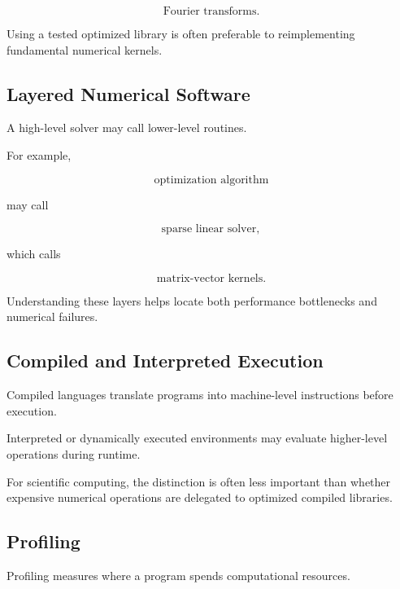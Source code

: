 \[
\boxed{
\text{Fourier transforms}.
}
\]

Using a tested optimized library is often preferable to reimplementing
fundamental numerical kernels.

\subsection{Layered Numerical Software}
\label{subsec:layered-numerical-software}

A high-level solver may call lower-level routines.

For example,

\[
\boxed{
\text{optimization algorithm}
}
\]

may call

\[
\boxed{
\text{sparse linear solver},
}
\]

which calls

\[
\boxed{
\text{matrix-vector kernels}.
}
\]

Understanding these layers helps locate both performance bottlenecks and
numerical failures.

\subsection{Compiled and Interpreted Execution}
\label{subsec:compiled-interpreted}

Compiled languages translate programs into machine-level instructions
before execution.

Interpreted or dynamically executed environments may evaluate higher-level
operations during runtime.

For scientific computing, the distinction is often less important than
whether expensive numerical operations are delegated to optimized compiled
libraries.

\subsection{Profiling}
\label{subsec:scientific-profiling}

Profiling measures where a program spends computational resources.

